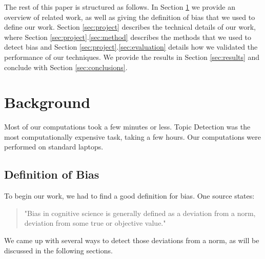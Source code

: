 \documentclass[final]{ieee}
\begin{document}
The rest of this paper is structured as follows. In Section \ref{sec:background} we provide an overview of related work, as well as giving the definition of bias that we used to define our work. Section \ref{sec:project} describes the technical details of our work, where Section \ref{sec:project}.\ref{sec:method} describes the methods that we used to detect bias and Section \ref{sec:project}.\ref{sec:evaluation} details how we validated the performance of our techniques. We provide the results in Section \ref{sec:results} and conclude with Section \ref{sec:conclusions}. 

     

            
            
\section{Background}\label{sec:background}



Most of our computations took a few minutes or less. Topic Detection was the most computationally expensive task, taking a few hours. Our computations were performed on standard laptops.

\subsection{Definition of Bias}\label{sec:definition}
To begin our work, we had to find a good definition for bias. One source\cite{Caverni90} states:
  \begin{quotation}
    "Bias in cognitive science is generally defined as a deviation from a norm, deviation from some true or objective value."
  \end{quotation}
We came up with several ways to detect those deviations from a norm, as will be discussed in the following sections.


%            
%
\end{document}
